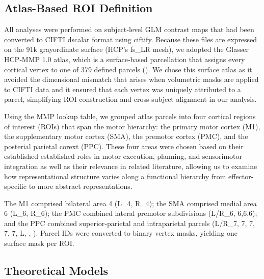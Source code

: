 \documentclass{article}
\begin{document}
\subsection{Atlas-Based ROI Definition}
All analyses were performed on subject‑level GLM contrast maps that had been converted to CIFTI dscalar format using ciftify.  Because these files are expressed on the 91k grayordinate surface (HCP’s fs\_LR mesh), we adopted the Glasser HCP‑MMP 1.0 atlas, which is a surface‑based parcellation that assigns every cortical vertex to one of 379 defined parcels (\cite{atlas}). We chose this surface atlas as it avoided the dimensional mismatch that arises when volumetric masks are applied to CIFTI data and it ensured that each vertex was uniquely attributed to a parcel, simplifying ROI construction and cross‑subject alignment in our analysis. 

Using the MMP lookup table, we grouped atlas parcels into four cortical regions of interest (ROIs) that span the motor hierarchy: the primary motor cortex (M1), the supplementary motor cortex (SMA), the premotor cortex (PMC), and the posterial parietal corext (PPC). These four areas were chosen based on their established established roles in motor execution, planning, and sensorimotor integration as well as their relevance in related literature, allowing us to examine how representational structure varies along a functional hierarchy from effector-specific to more abstract representations.

The M1 comprised bilateral area 4 (L\_4, R\_4); the SMA comprised medial area 6 (L\_6, R\_6); the PMC combined lateral premotor subdivisions (L/R\_6, 6,6,6); and the PPC combined superior‑parietal and intraparietal parcels (L/R\_7, 7, 7, 7, 7, L,  , ). Parcel IDs were converted to binary vertex masks, yielding one surface mask per ROI.
 
\subsection{Theoretical Models}
\end{document}
